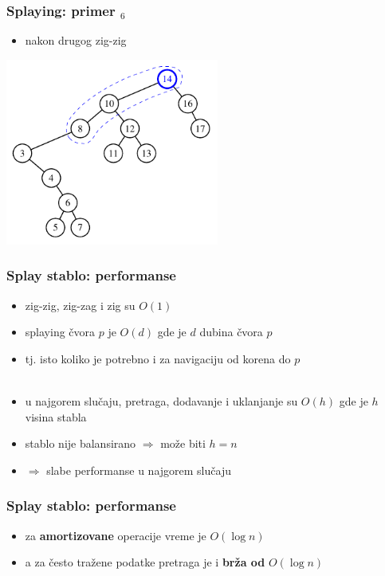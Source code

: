 \documentclass[compress]{beamer}
\begin{document}
\begin{frame}[fragile]
  \frametitle{Splaying: primer $_6$}
  \begin{itemize}
    \item nakon drugog zig-zig
  \end{itemize}
  \begin{center}
    \includegraphics[width=7cm]{asp-11-pic26.pdf}
  \end{center}
\end{frame}

\begin{frame}[fragile]
  \frametitle{Splay stablo: performanse}
  \begin{itemize}
    \item zig-zig, zig-zag i zig su $O(1)$
    \item splaying čvora $p$ je $O(d)$ gde je $d$ dubina čvora $p$
    \item tj. isto koliko je potrebno i za navigaciju od korena do $p$ \\ \ \\
    \item u najgorem slučaju, pretraga, dodavanje i uklanjanje su $O(h)$ gde je $h$ visina stabla
    \item stablo nije balansirano $\Rightarrow$ može biti $h=n$
    \item $\Rightarrow$ slabe performanse u najgorem slučaju
  \end{itemize}
\end{frame}

\begin{frame}[fragile]
  \frametitle{Splay stablo: performanse}
  \begin{itemize}
    \item za \textbf{amortizovane} operacije vreme je $O(\log n)$
    \item a za često tražene podatke pretraga je i \textbf{brža od} $O(\log n)$
  \end{itemize}
\end{frame}
\end{document}
